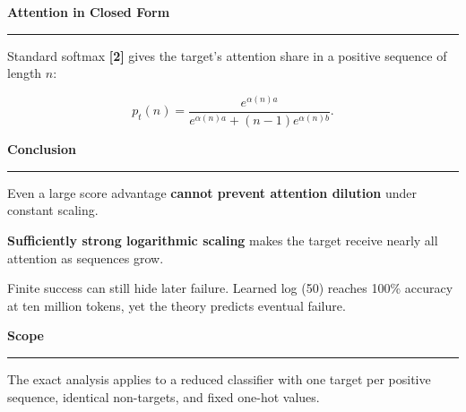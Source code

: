 \documentclass[12pt]{article}
\newcommand{\BodyFont}{\fontsize{26}{31}\selectfont}
\newcommand{\sectionheading}[1]{%
  {\RaggedRight\color{Navy}\bfseries\fontsize{34}{39}\selectfont #1\par}%
  \vspace{0.05in}%
  {\color{Navy}\rule{0.78in}{3pt}}\par
  \vspace{0.12in}%
}
\newcommand{\takeawaybullet}{%
  \makebox[0.38in][l]{\textcolor{Navy}{\fontsize{34}{41}\selectfont\textbullet}}%
}
\begin{document}
\begin{minipage}[t]{8.30in}
\vspace{0pt}
\begin{contentcard}[height=4.80in]
\begin{minipage}[t][4.05in][t]{\linewidth}
\vspace{0pt}
\sectionheading{Attention in Closed Form}
{\fontsize{24}{29}\selectfont
Standard softmax \textbf{[2]} gives the target's attention share in a positive
sequence of length $n$:\par}
\vfill
{\fontsize{36}{43}\selectfont
\[
  p_t(n)=\frac{e^{\alpha(n)a}}
  {e^{\alpha(n)a}+(n-1)e^{\alpha(n)b}}.
\]}
\vfill
\end{minipage}
\end{contentcard}

\vspace{0.28in}
\begin{contentcard}[height=9.20in]
\begin{minipage}[t][8.65in][t]{\linewidth}
\vspace{0pt}
\sectionheading{Conclusion}

\vspace{0.15in}
\takeawaybullet\hspace{0.12in}%
\begin{minipage}[t]{\dimexpr\linewidth-0.50in\relax}
{\fontsize{34}{41}\selectfont
Even a large score advantage \textbf{cannot prevent attention dilution} under
constant scaling.\par}
\end{minipage}

\vfill
\takeawaybullet\hspace{0.12in}%
\begin{minipage}[t]{\dimexpr\linewidth-0.50in\relax}
{\fontsize{34}{41}\selectfont
\textbf{Sufficiently strong logarithmic scaling} makes the target receive nearly
all attention as sequences grow.\par}
\end{minipage}

\vfill
{\normalfont\BodyFont\RaggedRight
Finite success can still hide later failure. Learned log (50) reaches 100\%
accuracy at ten million tokens, yet the theory predicts eventual failure.\par}
\end{minipage}
\end{contentcard}

\vspace{0.28in}
\begin{contentcard}[height=4.70in]
\begin{minipage}[t][4.15in][t]{\linewidth}
\vspace{0pt}
\sectionheading{Scope}
The exact analysis applies to a reduced classifier with one target per positive
sequence, identical non-targets, and fixed one-hot values.


\end{minipage}
\end{contentcard}
\end{minipage}
\end{document}
